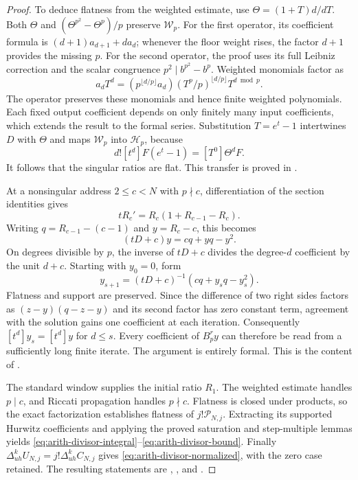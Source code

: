 \begin{proof}
To deduce flatness from the weighted estimate, use
$\Theta=(1+T)d/dT$.  Both $\Theta$ and
$(\Theta^{p^2}-\Theta^p)/p$ preserve $\mathcal W_p$.
For the first operator, its coefficient formula is
$(d+1)a_{d+1}+da_d$; whenever the floor weight rises, the factor $d+1$
provides the missing $p$.  For the second operator, the proof uses its
full Leibniz correction and the scalar congruence
$p^2\mid b^{p^2}-b^p$.  Weighted monomials factor as
\[
 a_dT^d=(p^{\lfloor d/p\rfloor}a_d)
          (T^p/p)^{\lfloor d/p\rfloor}T^{d\bmod p}.
\]
The operator preserves these monomials and hence finite weighted
polynomials.  Each fixed output coefficient depends on only finitely many
input coefficients, which extends the result to the formal series.
Substitution $T=e^t-1$ intertwines $D$ with $\Theta$ and maps
$\mathcal W_p$ into $\mathcal H_p$, because
\[
 d![t^d]F(e^t-1)=[T^0]\Theta^dF.
\]
It follows that the singular ratios are flat.  This transfer is proved in
.

At a nonsingular address $2\le c<N$ with $p\nmid c$, differentiation of the section
identities gives
\[
 tR_c'=R_c(1+R_{c-1}-R_c).
\]
Writing $q=R_{c-1}-(c-1)$ and $y=R_c-c$, this becomes
\[
 (tD+c)y=cq+yq-y^2.
\]
On degrees divisible by $p$, the inverse of $tD+c$ divides the degree-$d$
coefficient by the unit $d+c$.  Starting with $y_0=0$, form
\[
 y_{s+1}=(tD+c)^{-1}(cq+y_sq-y_s^2).
\]
Flatness and support are preserved.  Since the difference of two right
sides factors as $(z-y)(q-z-y)$ and its second factor has zero constant
term, agreement with the solution gains one coefficient at each iteration.
Consequently $[t^d]y_s=[t^d]y$ for $d\le s$.
Every coefficient of $B_p^r y$ can therefore be read from a sufficiently
long finite iterate.  The argument is entirely formal.
This is the content of
.

The standard window supplies the initial ratio $R_1$.  The weighted
estimate handles $p\mid c$, and Riccati propagation handles $p\nmid c$.
Flatness is closed under products, so the exact factorization establishes
flatness of $j!\mathcal P_{N,j}$.  Extracting its supported Hurwitz coefficients
and applying the proved saturation and step-multiple lemmas yields
\eqref{eq:arith-divisor-integral}--\eqref{eq:arith-divisor-bound}.
Finally $\Delta_{uh}^kU_{N,j}=j!\Delta_{uh}^kC_{N,j}$ gives
\eqref{eq:arith-divisor-normalized}, with the zero case retained.
The resulting statements are
,
, and
.
\end{proof}

